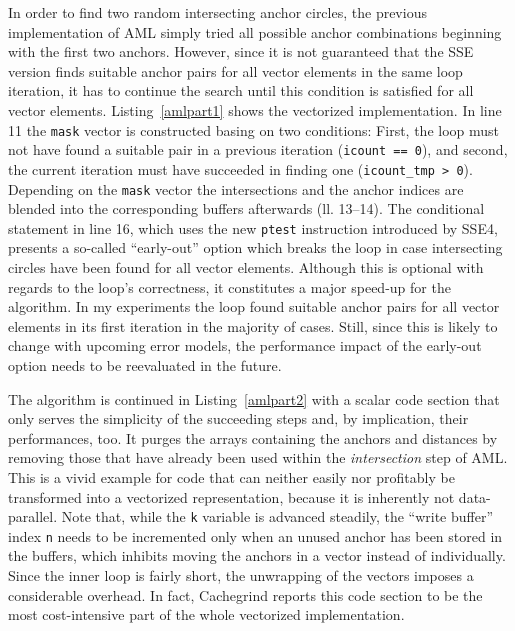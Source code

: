 
In order to find two random intersecting anchor circles, the previous implementation of AML simply tried all possible anchor combinations beginning with the first two anchors. However, since it is not guaranteed that the SSE version finds suitable anchor pairs for all vector elements in the same loop iteration, it has to continue the search until this condition is satisfied for all vector elements. Listing~\ref{amlpart1} shows the vectorized implementation. In line 11 the \texttt{mask} vector is constructed basing on two conditions: First, the loop must not have found a suitable pair in a previous iteration (\texttt{icount == 0}), and second, the current iteration must have succeeded in finding one (\texttt{icount\_tmp > 0}). Depending on the \texttt{mask} vector the intersections and the anchor indices are blended into the corresponding buffers afterwards (ll. 13--14). The conditional statement in line 16, which uses the new \texttt{ptest} instruction introduced by SSE4, presents a so-called ``early-out'' option which breaks the loop in case intersecting circles have been found for all vector elements. Although this is optional with regards to the loop's correctness, it constitutes a major speed-up for the algorithm. In my experiments the loop found suitable anchor pairs for all vector elements in its first iteration in the majority of cases. Still, since this is likely to change with upcoming error models, the performance impact of the early-out option needs to be reevaluated in the future.


The algorithm is continued in Listing~\ref{amlpart2} with a scalar code section that only serves the simplicity of the succeeding steps and, by implication, their performances, too. It purges the arrays containing the anchors and distances by removing those that have already been used within the \emph{intersection} step of AML. This is a vivid example for code that can neither easily nor profitably be transformed into a vectorized representation, because it is inherently not data-parallel. Note that, while the \texttt{k} variable is advanced steadily, the ``write buffer'' index \texttt{n} needs to be incremented only when an unused anchor has been stored in the buffers, which inhibits moving the anchors in a vector instead of individually. Since the inner loop is fairly short, the unwrapping of the vectors imposes a considerable overhead. In fact, Cachegrind reports this code section to be the most cost-intensive part of the whole vectorized implementation.

